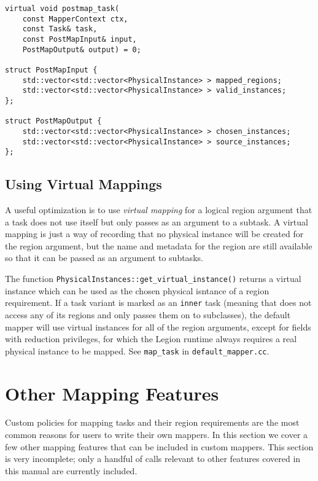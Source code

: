 \begin{lstlisting}
virtual void postmap_task(
    const MapperContext ctx,
    const Task& task,
    const PostMapInput& input,
    PostMapOutput& output) = 0;

struct PostMapInput {
    std::vector<std::vector<PhysicalInstance> > mapped_regions;
    std::vector<std::vector<PhysicalInstance> > valid_instances;
};

struct PostMapOutput {
    std::vector<std::vector<PhysicalInstance> > chosen_instances;
    std::vector<std::vector<PhysicalInstance> > source_instances;
};
\end{lstlisting}


\subsection{Using Virtual Mappings}
\label{subsec:mapping:virtual}
A useful optimization is to use {\em virtual mapping} for a logical region argument that a task does not use itself but only passes
as an argument to a subtask.  A virtual mapping is just a way of recording that no physical instance will be created for the region
argument, but the name and metadata for the region are still available so that it can be passed as an argument to subtasks.

The function {\tt PhysicalInstances::get\_virtual\_instance()} returns a virtual instance which can be used as the chosen physical
isntance of a region requirement.   If a task variant is marked as an {\tt inner} task (meaning that does not access any of its regions and only passes them on to subclasses), the default mapper will use virtual instances for all of the region arguments, except for fields with reduction privileges, for which the Legion runtime always requires a real physical instance to be mapped.  See {\tt map\_task} in {\tt default\_mapper.cc}.



\section{Other Mapping Features}
\label{sec:mapping:others}

Custom policies for mapping tasks and their region requirements are the most common reasons for users to write their own mappers.
In this section we cover a few other mapping features that can be included in custom mappers.  This section is very incomplete; only
a handful of calls relevant to other features covered in this manual are currently included.
